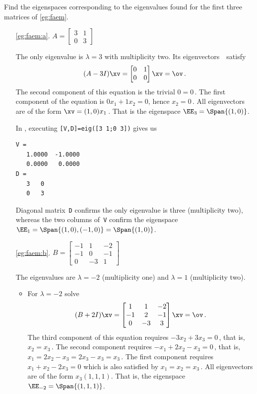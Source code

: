 \begin{example} \label{eg:faespm}
Find the eigenspaces corresponding to the eigenvalues found for the first three matrices of \autoref{eg:faem}.
\begin{itemize}
\item[\ref{eg:faem:a}.]
\(A=\begin{bmatrix} 3&1\\0&3 \end{bmatrix}\)
\begin{solution} 
The only eigenvalue is \(\lambda=3\) with multiplicity two.
Its eigenvectors~\xv\ satisfy
\begin{equation*}
(A-3 I)\xv=\begin{bmatrix} 0&1\\0&0 \end{bmatrix}\xv=\ov\,.
\end{equation*}
The second component of this equation is the trivial \(0=0\)\,.  The first component of the equation is \(0x_1+1x_2=0\), hence \(x_2=0\)\,.
All eigenvectors are of the form \(\xv=(1,0)x_1\)\,.  
That is the eigenspace  \(\EE_3=\Span\{(1,0)\}\).

In \script, executing \verb|[V,D]=eig([3 1;0 3])| gives us
\begin{verbatim}
V =
   1.0000  -1.0000
   0.0000   0.0000
D =
   3   0
   0   3
\end{verbatim}
Diagonal matrix~\verb|D| confirms the only eigenvalue is three (multiplicity two), whereas the two columns of~\verb|V| confirm the eigenspace \(\EE_1=\Span\{(1,0),(-1,0)\}=\Span\{(1,0)\}\).
\end{solution}


\item[\ref{eg:faem:b}.]
\(B=\begin{bmatrix}-1&1&-2
\\-1&0&-1
\\0&-3&1 \end{bmatrix}\)
\begin{solution} 
The eigenvalues are \(\lambda=-2\) (multiplicity one) and \(\lambda=1\) (multiplicity two).
\begin{itemize}
\item For \(\lambda=-2\) solve
\begin{equation*}
(B+2I)\xv=\begin{bmatrix}1&1&-2
\\-1&2&-1
\\0&-3&3 \end{bmatrix}\xv=\ov\,.
\end{equation*}
The third component of this equation requires \(-3x_2+3x_3=0\)\,, that is, \(x_2=x_3\)\,.
The second component requires \(-x_1+2x_2-x_3=0\)\,, that is, \(x_1=2x_2-x_3=2x_3-x_3=x_3\)\,.
The first component requires \(x_1+x_2-2x_3=0\) which is also satisfied by \(x_1=x_2=x_3\)\,.
All eigenvectors are of the form \(x_3(1,1,1)\).
That is, the eigenspace \(\EE_{-2}=\Span\{(1,1,1)\}\).


\end{itemize}
\end{solution}
\end{itemize}
\end{example}
